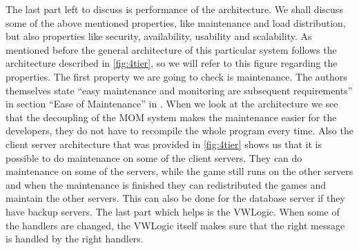 The last part left to discuss is performance of the architecture. 
We shall discuss some of the above mentioned properties, like maintenance and load distribution, but also properties like security, availability, usability and scalability. 
As mentioned before the general architecture of this particular system follows the architecture described in \autoref{fig:4tier}, so we will refer to this figure regarding the properties. 
The first property we are going to check is maintenance. 
The authors themselves state ``easy maintenance and monitoring are subsequent requirements'' in section ``Ease of Maintenance'' in \cite{middleware}. 
When we look at the architecture we see that the decoupling of the MOM system makes the maintenance easier for the developers, they do not have to recompile the whole program every time. 
Also the client server architecture that was provided in \autoref{fig:4tier} shows us that it is possible to do maintenance on some of the client servers. 
They can do maintenance on some of the servers, while the game still runs on the other servers and when the maintenance is finished they can redistributed the games and maintain the other servers. 
This can also be done for the database server if they have backup servers. 
The last part which helps is the VWLogic. 
When some of the handlers are changed, the VWLogic itself makes sure that the right message is handled by the right handlers. \\

